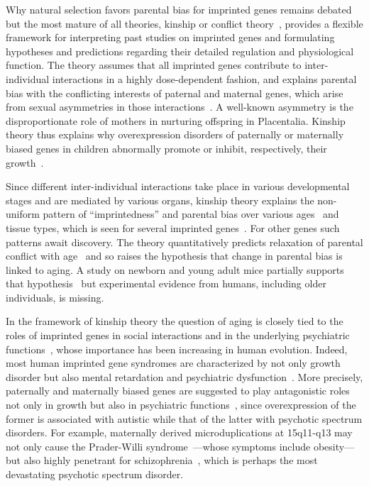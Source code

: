 \documentclass[letterpaper]{article}
\begin{document}
Why natural selection favors parental bias for imprinted genes remains
debated~\cite{Wilkins2003,McDonald2005,Keverne2015} but the most mature of all
theories, kinship or conflict theory~\cite{Wilkins2003}, provides a flexible
framework for interpreting past studies on imprinted genes and formulating
hypotheses and predictions regarding their detailed regulation and
physiological function.  The theory assumes that all imprinted genes contribute to
inter-individual interactions in a highly dose-dependent fashion, and explains
parental bias with the conflicting interests of paternal and maternal genes,
which arise from sexual asymmetries in those interactions~\cite{Wilkins2003}.
A well-known asymmetry is the disproportionate role of mothers in
nurturing offspring in Placentalia.  Kinship theory thus explains why
overexpression disorders of paternally or maternally biased genes in children
abnormally promote or inhibit, respectively, their
growth~\cite{Plasschaert2014,Peters2014}.

Since different inter-individual interactions take place in various
developmental stages and are mediated by various organs, kinship theory
explains the non-uniform pattern of ``imprintedness'' and parental bias over
various ages~\cite{Bourke2007} and tissue types, which is seen for several
imprinted genes~\cite{Plasschaert2014,Peters2014}.  For other genes such
patterns await discovery.  The theory quantitatively predicts relaxation of
parental conflict with age~\cite{Ubeda2012} and so raises the hypothesis that
change in parental bias is linked to aging.  A study on newborn and young adult mice
partially supports that hypothesis~\cite{Perez2015} but experimental evidence
from humans, including older individuals, is missing.

In the framework of kinship theory the question of aging is closely tied to
the roles of imprinted genes in social interactions and in the underlying
psychiatric functions~\cite{Ubeda2012,Wilkins2003}, whose importance has been
increasing in human evolution.  Indeed, most human imprinted gene syndromes
are characterized by not only growth disorder but also mental retardation and
psychiatric dysfunction~\cite{Plasschaert2014,Peters2014}.  More precisely,
paternally and maternally biased genes are suggested to play antagonistic
roles not only in growth but also in psychiatric functions~\cite{Crespi2008a},
since overexpression of the former is associated with autistic while that of
the latter with psychotic spectrum disorders.  For example, maternally derived
microduplications at 15q11-q13 may not only cause the Prader-Willi
syndrome~\cite{Peters2014}---whose symptoms include obesity---but also highly
penetrant for schizophrenia~\cite{Ingason2011,Sullivan2012}, which is perhaps
the most devastating psychotic spectrum disorder.
\end{document}
